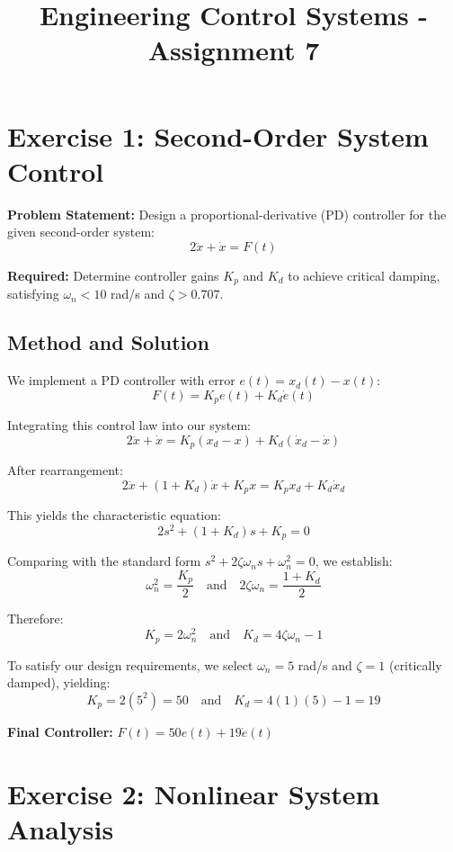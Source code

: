 \documentclass{article}
\begin{document}
\title{Engineering Control Systems - Assignment 7}
\author{}
\date{}
\maketitle

\section{Exercise 1: Second-Order System Control}

\textbf{Problem Statement:} Design a proportional-derivative (PD) controller for the given second-order system:
\[
2\ddot{x} + \dot{x} = F(t)
\]

\textbf{Required:} Determine controller gains $K_p$ and $K_d$ to achieve critical damping, satisfying $\omega_n < 10$ rad/s and $\zeta > 0.707$.

\subsection*{Method and Solution}

We implement a PD controller with error $e(t) = x_d(t) - x(t)$:
\[
F(t) = K_p e(t) + K_d \dot{e}(t)
\]

Integrating this control law into our system:
\[
2\ddot{x} + \dot{x} = K_p (x_d - x) + K_d (\dot{x}_d - \dot{x})
\]

After rearrangement:
\[
2\ddot{x} + (1 + K_d)\dot{x} + K_p x = K_p x_d + K_d \dot{x}_d
\]

This yields the characteristic equation:
\[
2s^2 + (1 + K_d)s + K_p = 0
\]

Comparing with the standard form $s^2 + 2\zeta\omega_n s + \omega_n^2 = 0$, we establish:
\[
\omega_n^2 = \frac{K_p}{2} \quad \text{and} \quad 2\zeta\omega_n = \frac{1 + K_d}{2}
\]

Therefore:
\[
K_p = 2\omega_n^2 \quad \text{and} \quad K_d = 4\zeta\omega_n - 1
\]

To satisfy our design requirements, we select $\omega_n = 5$ rad/s and $\zeta = 1$ (critically damped), yielding:
\[
K_p = 2(5^2) = 50 \quad \text{and} \quad K_d = 4(1)(5) - 1 = 19
\]

\textbf{Final Controller:} $F(t) = 50e(t) + 19\dot{e}(t)$

\section{Exercise 2: Nonlinear System Analysis}
\end{document}

